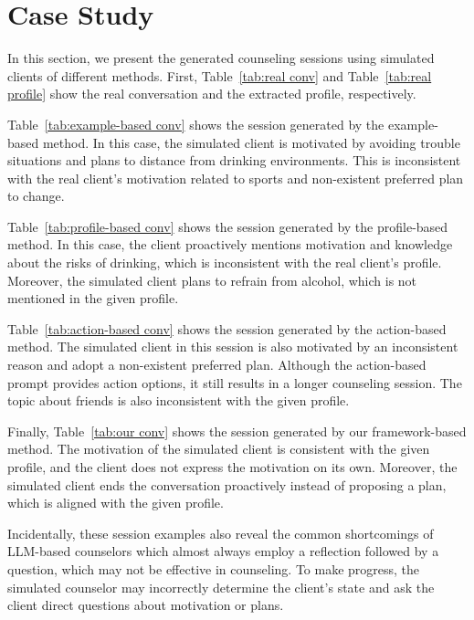 \section{Case Study}
\label{app:case}

In this section, we present the generated counseling sessions using simulated clients of different methods. First, Table~\ref{tab:real conv} and Table~\ref{tab:real profile} show the real conversation and the extracted profile, respectively.

Table~\ref{tab:example-based conv} shows the session generated by the example-based method. In this case, the simulated client is motivated by avoiding trouble situations and plans to distance from drinking environments. This is inconsistent with the real client's motivation related to sports and non-existent preferred plan to change. 

Table~\ref{tab:profile-based conv} shows the session generated by the profile-based method. In this case, the client proactively mentions motivation and knowledge about the risks of drinking, which is inconsistent with the real client's profile. Moreover, the simulated client plans to refrain from alcohol, which is not mentioned in the given profile. 

Table~\ref{tab:action-based conv} shows the session generated by the action-based method. The simulated client in this session is also motivated by an inconsistent reason and adopt a non-existent preferred plan. Although the action-based prompt provides action options, it still results in a longer counseling session. The topic about friends is also inconsistent with the given profile. 

Finally, Table~\ref{tab:our conv} shows the session generated by our framework-based method. The motivation of the simulated client is consistent with the given profile, and the client does not express the motivation on its own. Moreover, the simulated client ends the conversation proactively instead of proposing a plan, which is aligned with the given profile.

Incidentally, these session examples also reveal the common shortcomings of LLM-based counselors which almost always employ a reflection followed by a question, which may not be effective in counseling. To make progress, the simulated counselor may incorrectly determine the client's state and ask the client direct questions about motivation or plans.

